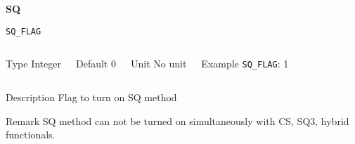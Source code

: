 
\begin{frame}[allowframebreaks,c]{} \label{SQ}

\begin{center}
\Huge \textbf{SQ}
\end{center}

\end{frame}


\begin{frame}[allowframebreaks]{\texttt{SQ\_FLAG}} \label{SQ_FLAG}
\vspace*{-12pt}
\begin{columns}
\begin{block}{Type}
Integer
\end{block}

\begin{block}{Default}
0
\end{block}

\begin{block}{Unit}
No unit
\end{block}

\begin{block}{Example}
\texttt{SQ\_FLAG}: 1
\end{block}
\end{columns}

\begin{block}{Description}
Flag to turn on SQ method 
\end{block}

\begin{block}{Remark}
SQ method can not be turned on simultaneously with CS, SQ3, hybrid functionals. 
\end{block}

\end{frame}


